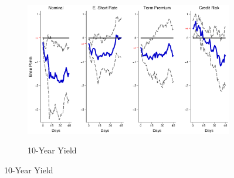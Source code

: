 \documentclass[a4paper, 12pt]{article}
\begin{document}
{\begin{landscape}
		\begin{figure}[tbph]
			\caption{Response of the Yield Curve to an Asset Purchase Surprise} \label{fig:LPEMlsap}
			\begin{center}
				\begin{minipage}{\linewidth}
					\begin{center}
						\begin{subfigure}[t]{\linewidth}
							\includegraphics[trim={0cm 0cm 0cm 0cm},clip,height=0.35\textheight,width=\linewidth]{../Figures/LSAPEMnomyptpphi120m.eps} \\
							\vspace{-0.35cm}
							\caption{10-Year Yield} \label{subfig:LPEM10Ylsap}
						\end{subfigure}
						
						\vspace{0.2cm}
						

\end{center}
\end{minipage}
\end{center}
\end{figure}
\end{landscape}}
\end{document}
